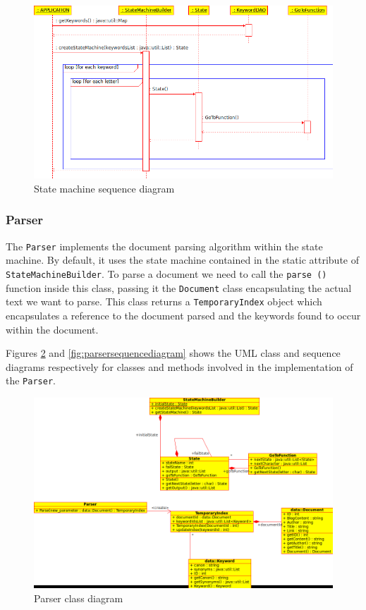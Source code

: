 \documentclass[10pt]{report}
\begin{document}
\begin{figure}
  \begin{center}
	\includegraphics[width=\textwidth,height=!]{statemachinesequencediagram}
  \end{center}
  \caption{State machine sequence diagram}
  \label{fig:statemachinesequencediagram}
\end{figure} 


\subsubsection{Parser}
The \texttt{Parser} implements the document parsing algorithm within
the state machine. By default, it uses the state machine contained
in the static attribute of \texttt{StateMachineBuilder}. To parse a
document we need to call the \texttt{parse ()} function inside this
class, passing it the \texttt{Document} class encapsulating the actual
text we want to parse. This class returns a \texttt{TemporaryIndex}
object which encapsulates a reference to the document parsed and the
keywords found to occur within the document.

Figures \ref{fig:parserclassdiagram} and
\ref{fig:parsersequencediagram} shows the UML class and sequence
diagrams respectively for classes and methods involved in the
implementation of the \texttt{Parser}.

\begin{figure}
  \begin{center}
	\includegraphics[width=\textwidth,height=!]{parserclassdiagram}
  \end{center}
  \caption{Parser class diagram}
  \label{fig:parserclassdiagram}
\end{figure} 
\end{document}
